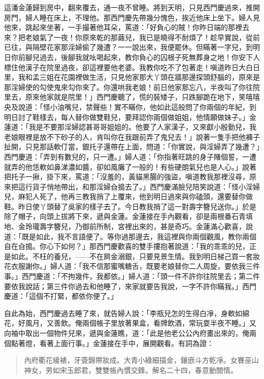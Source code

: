 這潘金蓮歸到房中，翻來覆去，通一夜不曾睡。將到天明，只見西門慶過來，推開房門，婦人睡在床上，不理他。那西門慶先帶幾分愧色，挨近他床上坐下。婦人見他來，跳起來坐著，一手撮著他耳朵，罵道：「好負心的賊！你昨日端的那裡去來？把老娘氣了一夜！你原來乾的那繭兒，我已是曉得不耐煩了！趁早實說，從前已往，與隔壁花家那淫婦偷了幾遭？一一說出來，我便罷休。但瞞著一字兒，到明日你前腳兒過去，後腳我就吆喝起來，教你負心的囚根子死無葬身之地！你安下人標住他漢子在院里過夜，卻這裡要他老婆。我教你吃不了包著走！嗔道昨日大白日里，我和孟三姐在花園裡做生活，只見他家那大丫頭在牆那邊探頭舒腦的，原來是那淫婦使的勾使鬼來勾你來了。你還哄我老娘！前日他家那忘八，半夜叫了你往院里去，原來他家就是院里！」西門慶聽了，慌的裝矮子，只跌腳跪在地下，笑嘻嘻央及說道：「怪小油嘴兒，禁聲些！實不瞞你，他如此這般問了你兩個的年紀，到明日討了鞋樣去，每人替你做雙鞋兒，要拜認你兩個做姐姐，他情願做妹子。」金蓮道：「我是不要那淫婦認甚哥哥姐姐的。他要了人家漢子，又來獻小殷勤兒，我老娘眼裡是放不下砂子的人，肯叫你在我跟前弄了鬼兒去！」說著一隻手把他褲子扯開，只見那話軟仃當，銀托子還帶在上面，問道：「你實說，與淫婦弄了幾遭？」西門慶道：「弄到有數兒的，只一遭。」婦人道：「你指著旺跳的身子賭個誓，一遭就弄的他恁軟如鼻涕濃如醬，卻如風癱了一般的！有些硬朗氣兒也是人心。」說著把托子一揪，掛下來，罵道：「沒羞的，黃貓黑腸的強盜，嗔道教我那裡沒尋，原來把這行貨子悄地帶出，和那淫婦㒲搗去了。」西門慶滿臉兒陪笑說道：「怪小淫婦兒，麻犯人死了，他再三教我捎了上覆來，他到明日過來與你磕頭，還要替你做鞋。昨日使丫頭替了吳家的樣子去了。今日教我捎了這一對壽字簪兒送你。」於是除了帽子，向頭上拔將下來，遞與金蓮。金蓮接在手內觀看，卻是兩根番石青填地、金玲瓏壽字簪兒，乃御前所制，宮裡出來的，甚是奇巧。金蓮滿心歡喜，說道：「既是如此，我不言語便了。等你過那邊去，我這裡與你兩個觀風，教你兩個自在㒲搗。你心下如何？」那西門慶歡喜的雙手摟抱著說道：「我的乖乖的兒，正是如此。不枉的養兒，——不在屙金溺銀，只要見景生情。我到明日梯己買一套妝花衣服謝你。」婦人道：「我不信那蜜嘴糖舌，既要老娘替你二人周旋，要依我三件事。」西門慶道：「不拘幾件，我都依。」婦人道：「頭一件不許你往院里去；第二件要依我說話；第三件你過去和他睡了，來家就要告我說，一字不許你瞞我。」西門慶道：「這個不打緊，都依你便了。」

自此為始，西門慶過去睡了來，就告婦人說：「李瓶兒怎的生得白凈，身軟如綿花，好風月，又善飲。俺兩個帳子里放著果盒，看牌飲酒，常玩耍半夜不睡。」又向袖中取出一個物件兒來，遞與金蓮瞧，道：「此是他老公公內府畫出來的，俺兩個點著燈，看著上面行事。」金蓮接在手中，展開觀看。有詞為證：
\begin{quote}
內府衢花綾裱，牙簽錦帶妝成。大青小綠細描金，鑲嵌斗方乾凈。女賽巫山神女，男如宋玉郎君，雙雙帳內慣交鋒。解名二十四，春意動關情。
\end{quote}


